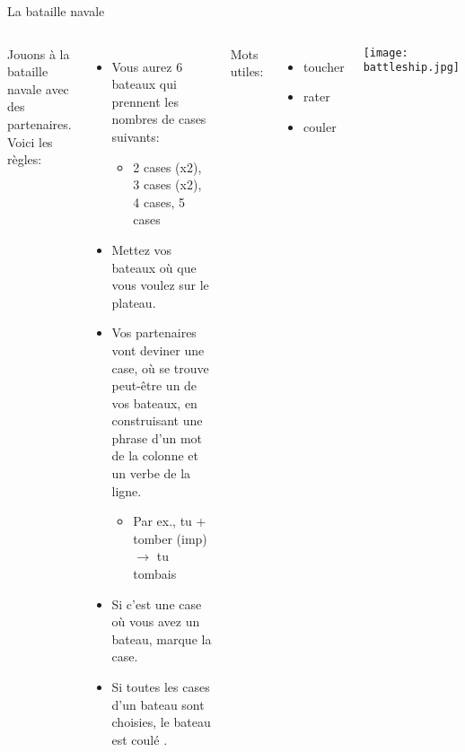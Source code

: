 \begin{frame}{La bataille navale}
  \scriptsize
    \begin{columns}
        Jouons à la bataille navale avec des partenaires.
        Voici les règles:
        \begin{itemize}
          \item Vous aurez 6 bateaux qui prennent les nombres de cases  suivants:
          \begin{itemize}
            \scriptsize
            \item 2 cases (x2), 3 cases (x2), 4 cases, 5 cases
          \end{itemize}
          \item Mettez vos bateaux où que  vous voulez sur le plateau.
          \item Vos partenaires vont deviner une case, où se trouve peut-être un de vos bateaux, en construisant une phrase d'un mot de la colonne et un verbe de la ligne.
          \begin{itemize}
            \scriptsize
            \item Par ex., tu + tomber (imp) $\to$ tu tombais
          \end{itemize}
          \item Si c'est une case où vous avez un bateau, marque la case.
          \item Si toutes les cases d'un bateau sont choisies, le bateau est coulé .
          \end{itemize}
        \small
        Mots utiles:
        \begin{itemize}
          \item toucher 
          \item rater 
          \item couler 
        \end{itemize}
        \texttt{[image: battleship.jpg]}
    \end{columns}
\end{frame}